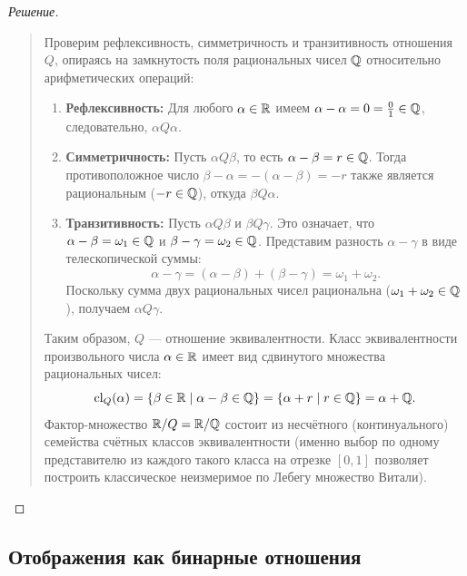 \begin{proof}[Решение]~\\
    \begin{quote}
        Проверим рефлексивность, симметричность и транзитивность отношения 
        $Q$, опираясь на замкнутость поля рациональных чисел $\mathbb{Q}$ 
        относительно арифметических операций:
        \begin{enumerate}
            \item \textbf{Рефлексивность:} Для любого $\alpha \in \mathbb{R}$ имеем 
            $\alpha - \alpha = 0 = \frac{0}{1} \in \mathbb{Q}$, следовательно, 
            $\alpha Q \alpha$.
            \item \textbf{Симметричность:} Пусть $\alpha Q \beta$, то есть 
            $\alpha - \beta = r \in \mathbb{Q}$. Тогда противоположное число 
            $\beta - \alpha = -(\alpha - \beta) = -r$ также является 
            рациональным ($-r \in \mathbb{Q}$), откуда $\beta Q \alpha$.
            \item \textbf{Транзитивность:} Пусть $\alpha Q \beta$ и 
            $\beta Q \gamma$. Это означает, что $\alpha - \beta = \omega_1 \in \mathbb{Q}$ 
            и $\beta - \gamma = \omega_2 \in \mathbb{Q}$. Представим разность 
            $\alpha - \gamma$ в виде телескопической суммы:
            \[
                \alpha - \gamma = (\alpha - \beta) + (\beta - \gamma) = 
                \omega_1 + \omega_2.
            \]
            Поскольку сумма двух рациональных чисел рациональна 
            ($\omega_1 + \omega_2 \in \mathbb{Q}$), получаем $\alpha Q \gamma$.
        \end{enumerate}
        Таким образом, $Q$ --- отношение эквивалентности. Класс 
        эквивалентности произвольного числа $\alpha \in \mathbb{R}$ имеет вид 
        сдвинутого множества рациональных чисел:
        \[
            \operatorname{cl}_Q(\alpha) = \{\beta \in \mathbb{R} \mid \alpha - \beta \in \mathbb{Q}\} = 
            \{\alpha + r \mid r \in \mathbb{Q}\} = \alpha + \mathbb{Q}.
        \]
        Фактор-множество $\mathbb{R} / Q = \mathbb{R} / \mathbb{Q}$ состоит из несчётного 
        (континуального) семейства счётных классов эквивалентности (именно 
        выбор по одному представителю из каждого такого класса на отрезке 
        $[0, 1]$ позволяет построить классическое неизмеримое по Лебегу 
        множество Витали).
    \end{quote}
\end{proof}

\subsection{Отображения как бинарные отношения}

